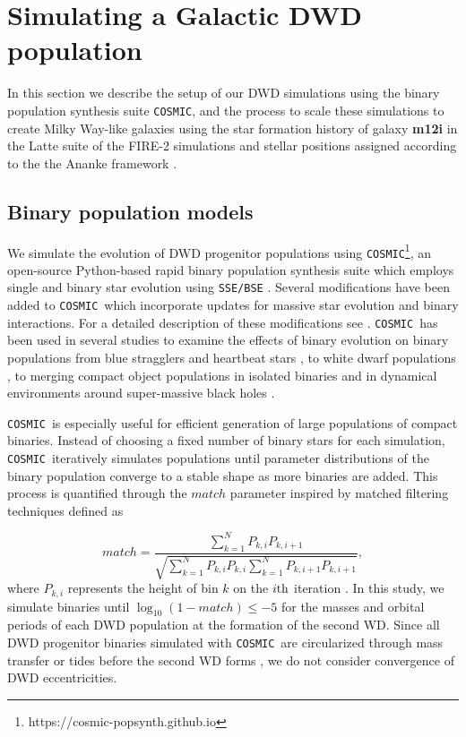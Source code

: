 \documentclass[twocolumn, linenumbers]{aastex631}
\newcommand{\cosmic}{\texttt{COSMIC}}
\begin{document}
\section{Simulating a Galactic DWD population}\label{sec:simulations}
In this section we describe the setup of our DWD simulations using the binary population synthesis suite \cosmic, and the process to scale these simulations to create Milky Way-like galaxies using the star formation history of galaxy \textbf{\textbf{m12i}} in the Latte suite of the FIRE-2 simulations \citep{Wetzel2016, Hopkins2018} and stellar positions assigned according to the the Ananke framework \citep{Sanderson2020}. 


\subsection{Binary population models}
\label{sec:bin_pop}
We simulate the evolution of DWD progenitor populations using \cosmic\footnote{https://cosmic-popsynth.github.io}, an open-source Python-based rapid binary population synthesis suite which employs single and binary star evolution using \texttt{SSE/BSE} \citep{Hurley2000, Hurley2002}. Several modifications have been added to \cosmic\ which incorporate updates for massive star evolution and binary interactions. For a detailed description of these modifications see \citet{Breivik2020a}. \cosmic\ has been used in several studies to examine the effects of binary evolution on binary populations from blue stragglers \citep{Leiner2021} and heartbeat stars \citep{Jayasinghe2021}, to white dwarf populations \citep{Kremer2017,Breivik2018,Kilic2021}, to merging compact object populations in isolated binaries \citep{Zevin2020b, Zevin2020a, Zevin2021, Wong2021, Mandhai2021} and in dynamical environments around super-massive black holes \citep{Stephan2019, Wang2021}. 

\cosmic\ is especially useful for efficient generation of large populations of compact binaries. Instead of choosing a fixed number of binary stars for each simulation, \cosmic\ iteratively simulates populations until parameter distributions of the binary population converge to a stable shape as more binaries are added. This process is quantified through the $match$ parameter inspired by matched filtering techniques \citep[e.g. Eq. 6 of ][]{Chatziioannou2017} defined as

\begin{equation}
   match = \frac{\sum_{k=1}^{N}P_{k,i}P_{k,i+1}}{\sqrt{\sum_{k=1}^{N}P_{k,i}P_{k,i}\sum_{k=1}^{N}P_{k,i+1}P_{k,i+1}}},
\end{equation}
where $P_{k,i}$ represents the height of bin $k$ on the $i\rm{th}$ iteration \citep{Breivik2020a}. In this study, we simulate binaries until $\log_{10}(1-match) \leq -5$ for the masses and orbital periods of each DWD population at the formation of the second WD. Since all DWD progenitor binaries simulated with \cosmic\ are circularized through mass transfer or tides before the second WD forms \citep[e.g.][]{Marsh2004, Gokhale2007, Sepinsky2014, Kremer2015}, we do not consider convergence of DWD eccentricities.
\end{document}
